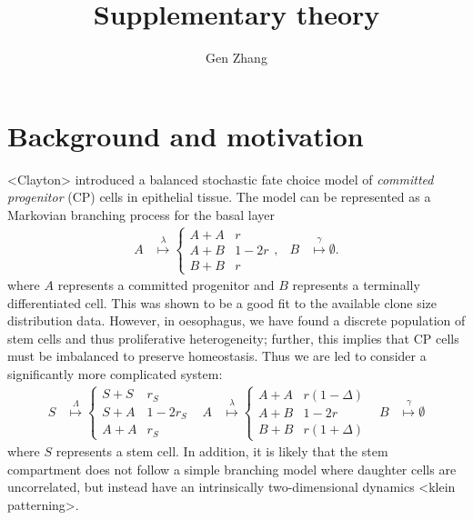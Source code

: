 \documentclass[10pt,UKenglish]{article}
\begin{document}
\title{Supplementary theory}
\author{Gen Zhang}
 
\maketitle

\renewcommand{\thesection}{S-\Roman{section}}

\section{\label{sec:introduction}Background and motivation}

<Clayton> introduced a balanced stochastic fate choice model of \emph{committed
progenitor} (CP) cells in epithelial tissue. The model can be represented as a
Markovian branching process for the basal layer 
\begin{align}
A &\overset{\lambda}{\longmapsto} \begin{cases}
A+A & r \\
A+B & 1-2r \\
B+B & r\end{cases}, & B &\overset{\gamma}{\longmapsto} \emptyset.
\label{eq:basal-model}
\end{align}
where $A$ represents a committed progenitor and $B$ represents a terminally
differentiated cell. This was shown to be a good fit to the available clone size
distribution data. However, in oesophagus, we have found a discrete population
of stem cells and thus proliferative heterogeneity; further, this implies that
CP cells must be imbalanced to preserve homeostasis. Thus we are led to consider
a significantly more complicated system: 
\begin{align}
S &\overset{\Lambda}{\longmapsto} \begin{cases}
S+S & r_S \\
S+A & 1-2r_S \\
A+A & r_S\end{cases} & A &\overset{\lambda}{\longmapsto} \begin{cases}
A+A & r(1-\Delta) \\
A+B & 1-2r \\
B+B & r(1+\Delta)\end{cases} & B &\overset{\gamma}{\longmapsto} \emptyset
\label{eq:really-full-model}
\end{align}
where $S$ represents a stem cell. In addition, it is likely that the stem
compartment does not follow a simple branching model where daughter cells are
uncorrelated, but instead have an intrinsically two-dimensional dynamics <klein
patterning>.
\end{document}
